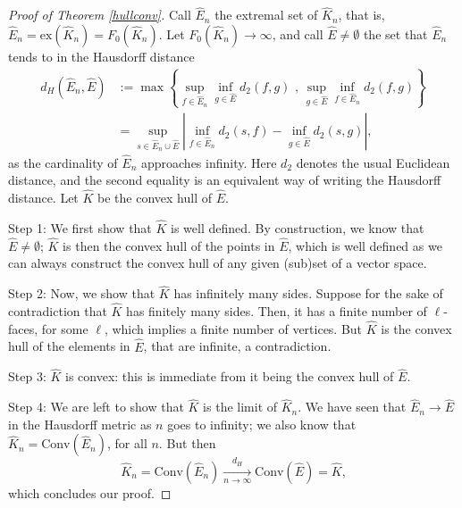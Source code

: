 \documentclass[12pt, reqno]{amsart}
\theoremstyle{definition}
\begin{document}
\iffalse
\begin{proof}[Proof of Theorem \ref{hullconv}]
Call $\hat{E}_n$ the extremal set of $\hat{K}_n$, that is, $\hat{E}_n= \text{ex}(\hat{K}_n)=F_0(\hat{K}_n)$.
Let $F_0(\hat{K}_n) \rightarrow \infty$, and call $\hat{E} \neq \emptyset$ the set that $\hat{E}_n$ tends to in the Hausdorff distance
\begin{align*}
d_H(\hat{E}_n,\hat{{E}})&:=\max\left\lbrace{ \sup_{{f} \in \hat{E}_n} \inf_{{g} \in \hat{{E}}}d_2 \left( {f},{g} \right) \text{ , } \sup_{{g} \in \hat{{E}}} \inf_{{f} \in \hat{E}_n} d_2 \left( {f},{g} \right) }\right\rbrace\\
&=\sup_{{s} \in \hat{E}_n \cup \hat{{E}}} \left| \inf_{{f} \in \hat{E}_n} d_2 \left( {s},{f} \right) - \inf_{{g} \in \hat{{E}}} d_2 \left( {s},{g} \right) \right| \text{,}
\end{align*}
as the cardinality of $\hat{E}_n$  approaches infinity. Here $d_2$ denotes the usual Euclidean distance, and the second equality is an equivalent way of writing the Hausdorff distance. Let $\hat{{K}}$ be the convex hull of $\hat{{E}}$.

{Step 1}: We first show that $\hat{{K}}$ is well defined. By construction, we know that $\hat{{E}} \neq \emptyset$; $\hat{{K}}$ is then the convex hull of the points in $\hat{{E}}$, which is well defined as we can always construct the convex hull of any given (sub)set of a vector space.

{Step 2}: Now, we show that $\hat{K}$ has infinitely many sides. Suppose for the sake of contradiction that $\hat{K}$ has finitely many sides. Then, it has a finite number of $\ell$-faces, for some $\ell$, which implies a finite number of vertices. But $\hat{K}$ is the convex hull of the elements in $\hat{{E}}$, that are infinite, a contradiction.

{Step 3}: $\hat{K}$ is convex: this is immediate from it being the convex hull of $\hat{{E}}$.

{Step 4}: We are left to show that $\hat{K}$ is the limit of $\hat{K}_n$. We have seen that $\hat{E}_n \rightarrow \hat{{E}}$ in the Hausdorff metric as $n$ goes to infinity; we also know that $\hat{K}_n=\text{Conv}(\hat{E}_n)$, for all $n$.  
But then
$$\hat{K}_n = \text{Conv}\left( \hat{E}_n \right) \xrightarrow[n \rightarrow \infty]{d_H} \text{Conv} (\hat{{E}} )=\hat{K} \text{,}$$
which concludes our proof.
\end{proof}
\end{document}
